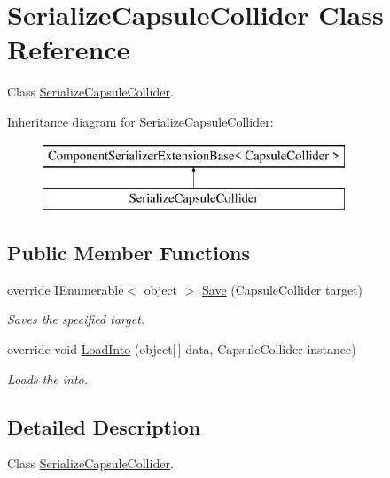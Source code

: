 \hypertarget{class_serialize_capsule_collider}{}\section{Serialize\+Capsule\+Collider Class Reference}
\label{class_serialize_capsule_collider}


Class \hyperlink{class_serialize_capsule_collider}{Serialize\+Capsule\+Collider}.  


Inheritance diagram for Serialize\+Capsule\+Collider\+:\begin{figure}[H]
\begin{center}
\leavevmode
\includegraphics[height=2.000000cm]{class_serialize_capsule_collider}
\end{center}
\end{figure}
\subsection*{Public Member Functions}
\begin{DoxyCompactItemize}
\item 
override I\+Enumerable$<$ object $>$ \hyperlink{class_serialize_capsule_collider_af02d52a90ac7718fee5f4775c3d441e6}{Save} (Capsule\+Collider target)
\begin{DoxyCompactList}\small\item\em Saves the specified target. \end{DoxyCompactList}\item 
override void \hyperlink{class_serialize_capsule_collider_ad5551346e6f64d17a17c65349ba4cd68}{Load\+Into} (object\mbox{[}$\,$\mbox{]} data, Capsule\+Collider instance)
\begin{DoxyCompactList}\small\item\em Loads the into. \end{DoxyCompactList}\end{DoxyCompactItemize}


\subsection{Detailed Description}
Class \hyperlink{class_serialize_capsule_collider}{Serialize\+Capsule\+Collider}. 



